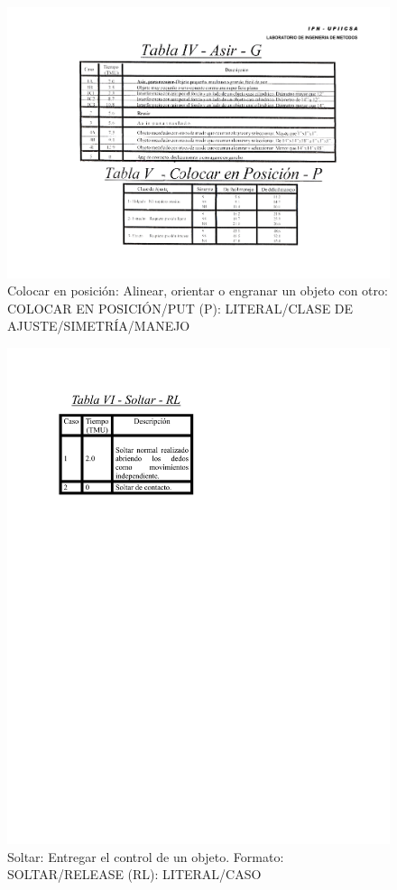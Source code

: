     
    \begin{figure}[H]
        \centering
        \includegraphics[scale=0.4]{15/img/tabla5ColocarPosicion.pdf}
        \caption{Colocar en posición: Alinear, orientar o engranar un objeto con otro: COLOCAR EN POSICIÓN/PUT (P): LITERAL/CLASE DE AJUSTE/SIMETRÍA/MANEJO}
        \label{fig:tabla5ColocarPosicion}
    \end{figure}
    
    \begin{figure}[H]
       \centering
        \includegraphics[scale=0.65]{15/img/tabla6Soltar.pdf}
        \caption{Soltar: Entregar el control de un objeto. Formato: SOLTAR/RELEASE (RL): LITERAL/CASO}
        \label{fig:tabla6Soltar}
    \end{figure}
    
